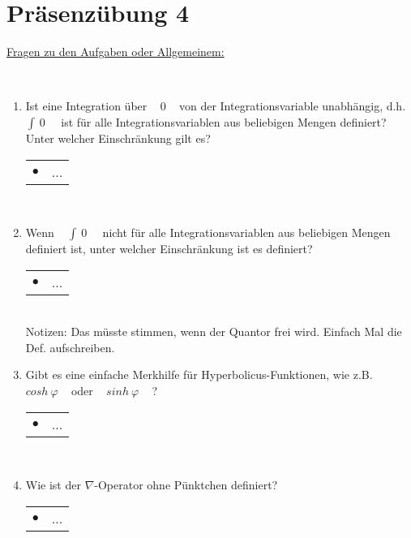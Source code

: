 

\chapter*{Präsenzübung 4}


\newpage

\underline{Fragen zu den Aufgaben oder Allgemeinem:}

~\\

\begin{enumerate}
	
	\item Ist eine Integration über ~ $0$ ~ von der Integrationsvariable unabhängig, d.h. ~ $ \int ~ 0 ~ $ ~ ist für alle Integrationsvariablen aus beliebigen Mengen definiert? Unter welcher Einschränkung gilt es? \\
	
	\begin{tabularx}{0.88\textwidth}{lX}
		$\bullet$ & ...
	\end{tabularx}
	
	~\\
	
	\item Wenn ~ $ \int ~ 0 ~ $ ~ nicht für alle Integrationsvariablen aus beliebigen Mengen definiert ist, unter welcher Einschränkung ist es definiert? \\
	
	\begin{tabularx}{0.88\textwidth}{lX}
		$\bullet$ & ...
	\end{tabularx}
	
	~\\Notizen: Das müsste stimmen, wenn der Quantor frei wird. Einfach Mal die Def. aufschreiben.
	~\\
	
		
	\item Gibt es eine einfache Merkhilfe für Hyperbolicus-Funktionen, wie z.B. ~ $cosh ~ \varphi$ ~ oder ~ $sinh ~ \varphi$ ~ ? \\
		
	\begin{tabularx}{0.88\textwidth}{lX}
		$\bullet$ & ...
	\end{tabularx}
		
	~\\
	
	\item Wie ist der $\nabla$-Operator ohne Pünktchen definiert? \\
	
	\begin{tabularx}{0.88\textwidth}{lX}
		$\bullet$ & ...
	\end{tabularx}
	
	~\\

\end{enumerate}





